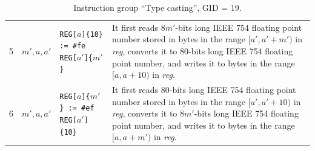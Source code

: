 \documentclass[10pt,twocolumn]{article}
\begin{document}
\begin{table}[!h]
\begin{center}
\begin{tabular}{lp{1.2cm}p{5.5cm}p{7.5cm}}
5 & $ m',a,a' $ %
& \texttt{REG[}$ a $\texttt{]\{10\} := \#fe REG[}$ a' $\texttt{]\{}$ m'
$\texttt{\}} %
& It first reads $ 8m' $-bits long IEEE 754 floating point number stored in
bytes in the range $ [a',a'+m') $ in \textit{reg}, converts it to $ 80 $-bits
long IEEE 754 floating point number, and writes it to bytes in the range $
[a,a+10) $ in \textit{reg}.
\\

6 & $ m',a,a' $ %
& \texttt{REG[}$ a $\texttt{]\{}$ m' $\texttt{\} := \#ef REG[}$ a'
$\texttt{]\{10\}} %
& It first reads 80-bits long IEEE 754 floating point number stored in bytes in
the range $ [a',a'+10) $ in \textit{reg}, converts it to $ 8m' $-bits long IEEE
754 floating point number, and writes it to bytes in the range $ [a,a+m') $ in
\textit{reg}.
\\

\end{tabular}
\end{center}
\caption{Instruction group ``Type casting'', GID = 19.}
\label{tab:igroup:typecasting}
\end{table}

\clearpage


\end{document}
